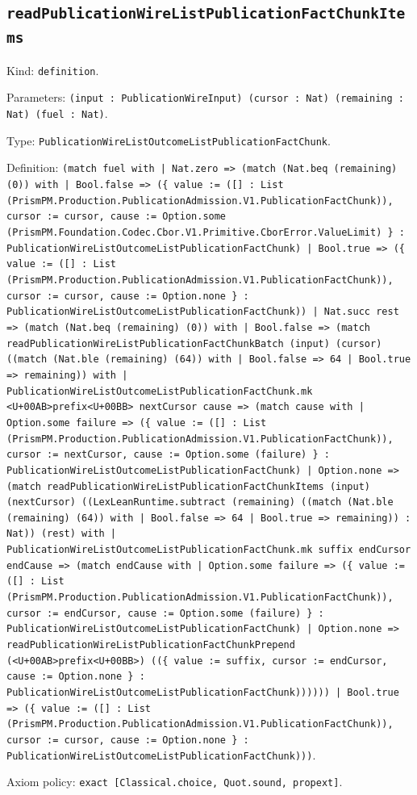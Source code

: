 \documentclass[11pt]{article}
\begin{document}
\subsection*{\texttt{readPublicationWireListPublicationFactChunkItems}}
\noindent Kind: \texttt{definition}.\par
\noindent Parameters: \texttt{(input : PublicationWireInput) (cursor : Nat) (remaining : Nat) (fuel : Nat)}.\par
\noindent Type: \texttt{PublicationWireListOutcomeListPublicationFactChunk}.\par
\noindent Definition: \texttt{(match fuel with | Nat.zero => (match (Nat.beq (remaining) (0)) with | Bool.false => (\{ value := ([] : List (PrismPM.Production.PublicationAdmission.V1.PublicationFactChunk)), cursor := cursor, cause := Option.some (PrismPM.Foundation.Codec.Cbor.V1.Primitive.CborError.ValueLimit) \} : PublicationWireListOutcomeListPublicationFactChunk) | Bool.true => (\{ value := ([] : List (PrismPM.Production.PublicationAdmission.V1.PublicationFactChunk)), cursor := cursor, cause := Option.none \} : PublicationWireListOutcomeListPublicationFactChunk)) | Nat.succ rest => (match (Nat.beq (remaining) (0)) with | Bool.false => (match readPublicationWireListPublicationFactChunkBatch (input) (cursor) ((match (Nat.ble (remaining) (64)) with | Bool.false => 64 | Bool.true => remaining)) with | PublicationWireListOutcomeListPublicationFactChunk.mk <U+00AB>prefix<U+00BB> nextCursor cause => (match cause with | Option.some failure => (\{ value := ([] : List (PrismPM.Production.PublicationAdmission.V1.PublicationFactChunk)), cursor := nextCursor, cause := Option.some (failure) \} : PublicationWireListOutcomeListPublicationFactChunk) | Option.none => (match readPublicationWireListPublicationFactChunkItems (input) (nextCursor) ((LexLeanRuntime.subtract (remaining) ((match (Nat.ble (remaining) (64)) with | Bool.false => 64 | Bool.true => remaining)) : Nat)) (rest) with | PublicationWireListOutcomeListPublicationFactChunk.mk suffix endCursor endCause => (match endCause with | Option.some failure => (\{ value := ([] : List (PrismPM.Production.PublicationAdmission.V1.PublicationFactChunk)), cursor := endCursor, cause := Option.some (failure) \} : PublicationWireListOutcomeListPublicationFactChunk) | Option.none => readPublicationWireListPublicationFactChunkPrepend (<U+00AB>prefix<U+00BB>) ((\{ value := suffix, cursor := endCursor, cause := Option.none \} : PublicationWireListOutcomeListPublicationFactChunk)))))) | Bool.true => (\{ value := ([] : List (PrismPM.Production.PublicationAdmission.V1.PublicationFactChunk)), cursor := cursor, cause := Option.none \} : PublicationWireListOutcomeListPublicationFactChunk)))}.\par
\noindent Axiom policy: \texttt{exact [Classical.choice, Quot.sound, propext]}.\par
\end{document}
